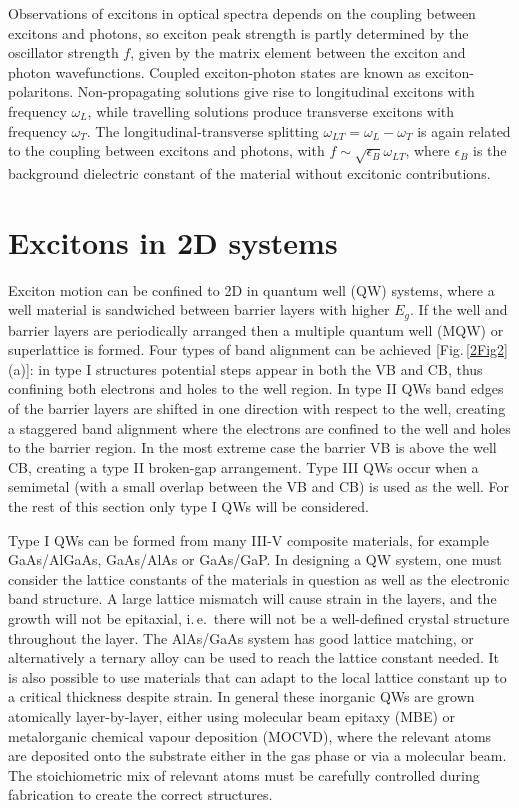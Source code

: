 Observations of excitons in optical spectra depends on the coupling between excitons and photons, so exciton peak strength is partly determined by the oscillator strength $f$, given by the matrix element between the exciton and photon wavefunctions. Coupled exciton-photon states are known as exciton-polaritons. Non-propagating solutions give rise to longitudinal excitons with frequency $\omega_L$, while travelling solutions produce transverse excitons with frequency $\omega_T$. The longitudinal-transverse splitting $\omega_{LT} = \omega_L - \omega_T$ is again related to the coupling between excitons and photons, with $f \sim \sqrt{\epsilon_B} \omega_{LT}$, where $\epsilon_B$ is the background dielectric constant of the material without excitonic contributions.

\section{Excitons in 2D systems}
\label{sec:ex2D}
Exciton motion can be confined to 2D in quantum well (QW) systems, where a well material is sandwiched between barrier layers with higher $E_g$. If the well and barrier layers are periodically arranged then a multiple quantum well (MQW) or superlattice is formed. Four types of band alignment can be achieved [Fig.\,\ref{2Fig2}(a)]: in type I structures potential steps appear in both the VB and CB, thus confining both electrons and holes to the well region. In type II QWs band edges of the barrier layers are shifted in one direction with respect to the well, creating a staggered band alignment where the electrons are confined to the well and holes to the barrier region. In the most extreme case the barrier VB is above the well CB, creating a type II broken-gap arrangement. Type III QWs occur when a semimetal (with a small overlap between the VB and CB) is used as the well. For the rest of this section only type I QWs will be considered.

Type I QWs can be formed from many III-V composite materials, for example GaAs/AlGaAs, GaAs/AlAs or GaAs/GaP. In designing a QW system, one must consider the lattice constants of the materials in question as well as the electronic band structure. A large lattice mismatch will cause strain in the layers, and the growth will not be epitaxial, i.\,e.\, there will not be a well-defined crystal structure throughout the layer. The AlAs/GaAs system has good lattice matching, or alternatively a ternary alloy can be used to reach the lattice constant needed. It is also possible to use materials that can adapt to the local lattice constant up to a critical thickness despite strain. In general these inorganic QWs are grown atomically layer-by-layer, either using molecular beam epitaxy (MBE) or metalorganic chemical vapour deposition (MOCVD), where the relevant atoms are deposited onto the substrate either in the gas phase or via a molecular beam. The stoichiometric mix of relevant atoms must be carefully controlled during fabrication to create the correct structures. 

